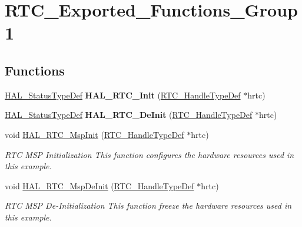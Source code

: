 \hypertarget{group___r_t_c___exported___functions___group1}{}\section{R\+T\+C\+\_\+\+Exported\+\_\+\+Functions\+\_\+\+Group1}
\label{group___r_t_c___exported___functions___group1}
\subsection*{Functions}
\begin{DoxyCompactItemize}
\item 
\mbox{\label{group___r_t_c___exported___functions___group1_gaa6b53830aa3e2efaf210c0b1d3e5f4a4}} 
\hyperlink{stm32f4xx__hal__def_8h_a63c0679d1cb8b8c684fbb0632743478f}{H\+A\+L\+\_\+\+Status\+Type\+Def} {\bfseries H\+A\+L\+\_\+\+R\+T\+C\+\_\+\+Init} (\hyperlink{struct_r_t_c___handle_type_def}{R\+T\+C\+\_\+\+Handle\+Type\+Def} $\ast$hrtc)
\item 
\mbox{\label{group___r_t_c___exported___functions___group1_ga24a8aac7bd6d9bac9f211d24ff6930ec}} 
\hyperlink{stm32f4xx__hal__def_8h_a63c0679d1cb8b8c684fbb0632743478f}{H\+A\+L\+\_\+\+Status\+Type\+Def} {\bfseries H\+A\+L\+\_\+\+R\+T\+C\+\_\+\+De\+Init} (\hyperlink{struct_r_t_c___handle_type_def}{R\+T\+C\+\_\+\+Handle\+Type\+Def} $\ast$hrtc)
\item 
void \hyperlink{group___r_t_c___exported___functions___group1_gaee6eddaa309c8c9829f1ca794d8f99c5}{H\+A\+L\+\_\+\+R\+T\+C\+\_\+\+Msp\+Init} (\hyperlink{struct_r_t_c___handle_type_def}{R\+T\+C\+\_\+\+Handle\+Type\+Def} $\ast$hrtc)
\begin{DoxyCompactList}\small\item\em R\+TC M\+SP Initialization This function configures the hardware resources used in this example. \end{DoxyCompactList}\item 
void \hyperlink{group___r_t_c___exported___functions___group1_ga8767bc3a4d472d39a688090ab10ba6ce}{H\+A\+L\+\_\+\+R\+T\+C\+\_\+\+Msp\+De\+Init} (\hyperlink{struct_r_t_c___handle_type_def}{R\+T\+C\+\_\+\+Handle\+Type\+Def} $\ast$hrtc)
\begin{DoxyCompactList}\small\item\em R\+TC M\+SP De-\/\+Initialization This function freeze the hardware resources used in this example. \end{DoxyCompactList}\end{DoxyCompactItemize}


